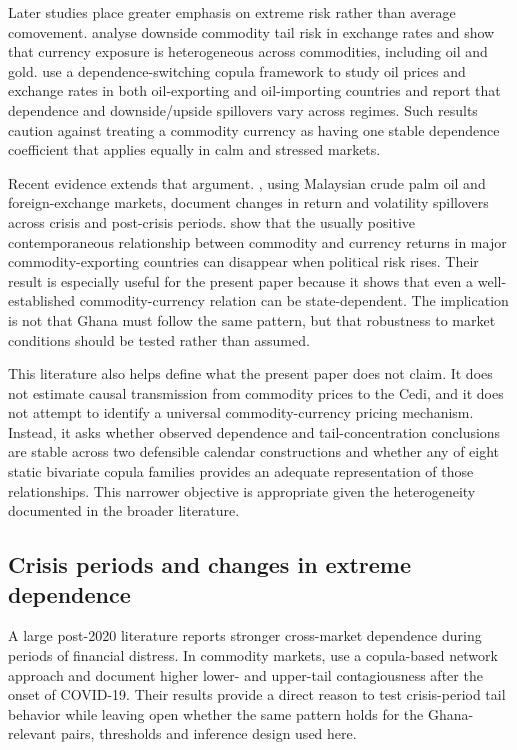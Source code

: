 Later studies place greater emphasis on extreme risk rather than average comovement. \citet{bondatti2022} analyse downside commodity tail risk in exchange rates and show that currency exposure is heterogeneous across commodities, including oil and gold. \citet{ning2025} use a dependence-switching copula framework to study oil prices and exchange rates in both oil-exporting and oil-importing countries and report that dependence and downside/upside spillovers vary across regimes. Such results caution against treating a commodity currency as having one stable dependence coefficient that applies equally in calm and stressed markets.

Recent evidence extends that argument. \citet{go2024}, using Malaysian crude palm oil and foreign-exchange markets, document changes in return and volatility spillovers across crisis and post-crisis periods. \citet{dodd2026} show that the usually positive contemporaneous relationship between commodity and currency returns in major commodity-exporting countries can disappear when political risk rises. Their result is especially useful for the present paper because it shows that even a well-established commodity-currency relation can be state-dependent. The implication is not that Ghana must follow the same pattern, but that robustness to market conditions should be tested rather than assumed.

This literature also helps define what the present paper does not claim. It does not estimate causal transmission from commodity prices to the Cedi, and it does not attempt to identify a universal commodity-currency pricing mechanism. Instead, it asks whether observed dependence and tail-concentration conclusions are stable across two defensible calendar constructions and whether any of eight static bivariate copula families provides an adequate representation of those relationships. This narrower objective is appropriate given the heterogeneity documented in the broader literature.

\subsection{Crisis periods and changes in extreme dependence}

A large post-2020 literature reports stronger cross-market dependence during periods of financial distress. In commodity markets, \citet{qiao2023} use a copula-based network approach and document higher lower- and upper-tail contagiousness after the onset of COVID-19. Their results provide a direct reason to test crisis-period tail behavior while leaving open whether the same pattern holds for the Ghana-relevant pairs, thresholds and inference design used here.


